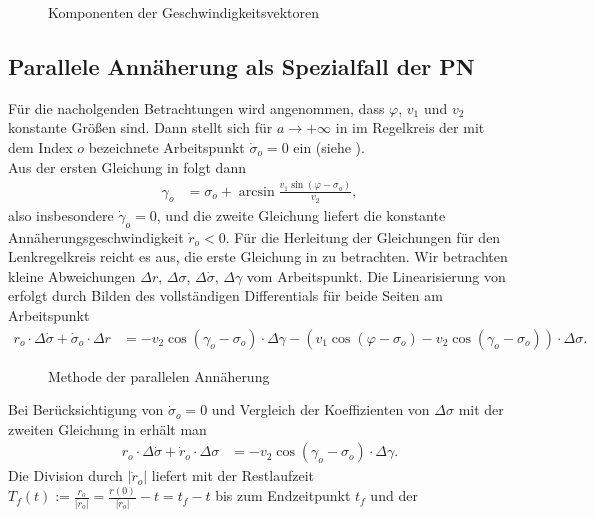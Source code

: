 \begin{figure}[htb]
	\centering
	
	\caption{Komponenten der Geschwindigkeitsvektoren}
	\label{fig:kap_3_bsp_rf_geschwindigkeit}
\end{figure}

\subsection{Parallele Annäherung als Spezialfall der \ac{PN}}
Für die nacholgenden Betrachtungen wird angenommen, dass $\varphi$, $v_1$ und $v_2$ konstante Größen sind. Dann stellt sich für $a\rightarrow +\infty$ in
 im Regelkreis der mit dem Index $o$ bezeichnete Arbeitspunkt $\dot{\sigma}_o=0$ ein (siehe ).\\
Aus der ersten Gleichung in  folgt dann
\begin{align}
	\gamma_o & = \sigma_o + \arcsin\frac{v_1 \sin(\varphi - \sigma_o)}{v_2},
\end{align}
also insbesondere $\dot{\gamma}_o=0$, und die zweite Gleichung liefert die konstante Annäherungsgeschwindigkeit $\dot{r}_o<0$. Für die Herleitung der Gleichungen für den Lenkregelkreis
reicht es aus, die erste Gleichung in  zu betrachten. Wir betrachten kleine Abweichungen $\Delta r$, $\Delta \sigma$, $\Delta\dot{\sigma}$, $\Delta
\gamma$ vom Arbeitspunkt. Die Linearisierung von  erfolgt durch Bilden des vollständigen Differentials für beide Seiten am Arbeitspunkt
\begin{align}
	r_o\cdot\Delta\dot{\sigma}+\dot{\sigma}_o\cdot\Delta r & = -v_2\cos(\gamma_o-\sigma_o)\cdot\Delta\gamma - \left(v_1\cos(\varphi - \sigma_o) - v_2\cos(\gamma_o -
	\sigma_o)\right)\cdot\Delta\sigma .
\end{align}
\begin{figure}[htb]
	\centering
	
	\caption{Methode der parallelen Annäherung}
	\label{fig:kap_3_bsp_rf_methode}
\end{figure}
Bei Berücksichtigung von $\dot{\sigma}_o=0$ und Vergleich der Koeffizienten von $\Delta\sigma$ mit der zweiten Gleichung in  erhält man
\begin{align}
r_o\cdot\Delta\dot{\sigma}+\dot{r}_o\cdot\Delta\sigma & = -v_2\cos(\gamma_o - \sigma_o)\cdot\Delta\gamma.
\end{align}
Die Division durch $|\dot{r}_o|$ liefert mit der Restlaufzeit $T_f(t):=\frac{r_o}{|\dot{r}_o|}=\frac{r(0)}{|\dot{r}_o|} - t=t_f - t$ bis zum Endzeitpunkt $t_f$ und der
